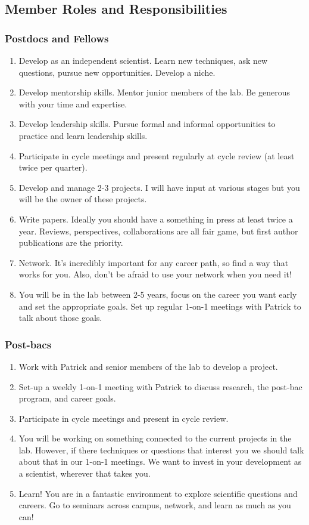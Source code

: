 \documentclass[10pt, a4paper, twocolumn]{article} %
\begin{document}
\subsection{Member Roles and Responsibilities}

\subsubsection{Postdocs and Fellows}
\begin{enumerate}
\item Develop as an independent scientist. Learn new techniques, ask new questions, pursue new opportunities. Develop a niche.
\item Develop mentorship skills. Mentor junior members of the lab. Be generous with your time and expertise.
\item Develop leadership skills. Pursue formal and informal opportunities to practice and learn leadership skills.
\item Participate in cycle meetings and present regularly at cycle review (at least twice per quarter).
\item Develop and manage 2-3 projects. I will have input at various stages but you will be the owner of these projects.
\item Write papers. Ideally you should have a something in press at least twice a year. Reviews, perspectives, collaborations are all fair game, but first author publications are the priority.
\item Network. It's incredibly important for any career path, so find a way that works for you. Also, don't be afraid to use your network when you need it!
\item You will be in the lab between 2-5 years, focus on the career you want early and set the appropriate goals. Set up regular 1-on-1 meetings with Patrick to talk about those goals.
\end{enumerate}
\subsubsection{Post-bacs}
\begin{enumerate}
\item Work with Patrick and senior members of the lab to develop a project.
\item Set-up a weekly 1-on-1 meeting with Patrick to discuss research, the post-bac program, and career goals.
\item Participate in cycle meetings and present in cycle review.
\item You will be working on something connected to the current projects in the lab. However, if there techniques or questions that interest you we should talk about that in our 1-on-1 meetings. We want to invest in your development as a scientist, wherever that takes you.
\item Learn! You are in a fantastic environment to explore scientific questions and careers. Go to seminars across campus, network, and learn as much as you can!
\end{enumerate}
\end{document}
